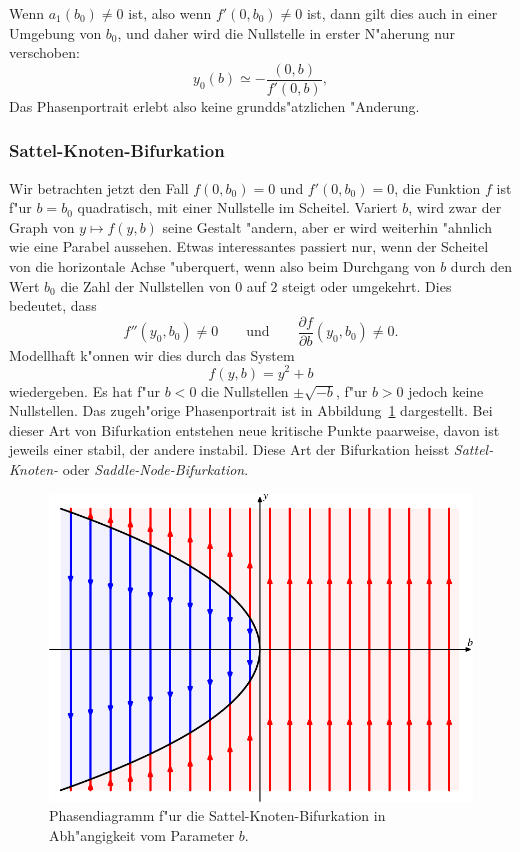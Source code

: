 Wenn $a_1(b_0)\ne0$ ist, also wenn $f'(0, b_0)\ne 0$ ist, dann 
gilt dies auch in einer Umgebung von $b_0$, und daher wird die
Nullstelle in erster N"aherung nur verschoben:
\[
y_0(b) \simeq -\frac{(0,b)}{f'(0,b)},
\]
Das Phasenportrait erlebt also keine grundds"atzlichen "Anderung.

\subsubsection{Sattel-Knoten-Bifurkation}
Wir betrachten jetzt den Fall $f(0,b_0)=0$ und $f'(0,b_0)=0$, die Funktion
$f$ ist f"ur $b=b_0$ quadratisch, mit einer Nullstelle im Scheitel.
Variert $b$, wird zwar der Graph von $y\mapsto f(y,b)$ seine
Gestalt "andern, aber er wird weiterhin "ahnlich wie eine Parabel
aussehen.
Etwas interessantes passiert nur, wenn der Scheitel von die horizontale
Achse "uberquert, wenn also beim Durchgang von $b$ durch den Wert $b_0$
die Zahl der Nullstellen von $0$ auf $2$ steigt oder umgekehrt.
Dies bedeutet, dass 
\[
f''(y_0,b_0)\ne 0
\qquad
\text{und}
\qquad
\frac{\partial f}{\partial b}(y_0, b_0)\ne 0.
\]
Modellhaft k"onnen wir dies durch das System
\[
f(y,b)=y^2+b
\]
wiedergeben.
Es hat f"ur $b<0$ die Nullstellen $\pm\sqrt{-b}$, f"ur $b>0$ jedoch
keine Nullstellen.
Das zugeh"orige Phasenportrait ist in Abbildung~\ref{geometrie:saddle-node}
dargestellt.
Bei dieser Art von Bifurkation entstehen neue kritische Punkte
paarweise, davon ist jeweils einer stabil, der andere instabil.
Diese Art der Bifurkation heisst {\em Sattel-Knoten-}
oder {\em Saddle-Node-Bifurkation}.

\begin{figure}
\centering
\includegraphics{chapters/images/bifurkation-1.pdf}
\caption{Phasendiagramm f"ur die Sattel-Knoten-Bifurkation in
Abh"angigkeit vom Parameter $b$.
\label{geometrie:saddle-node}}
\end{figure}


